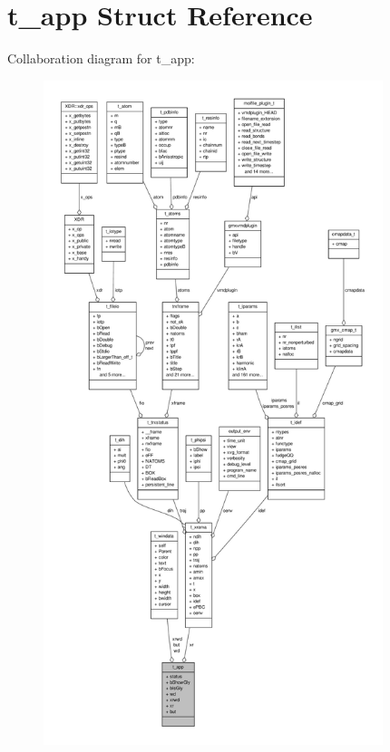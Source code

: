 \hypertarget{structt__app}{\section{t\-\_\-app \-Struct \-Reference}
\label{structt__app}
}


\-Collaboration diagram for t\-\_\-app\-:
\nopagebreak
\begin{figure}[H]
\begin{center}
\leavevmode
\includegraphics[height=550pt]{structt__app__coll__graph}
\end{center}
\end{figure}
